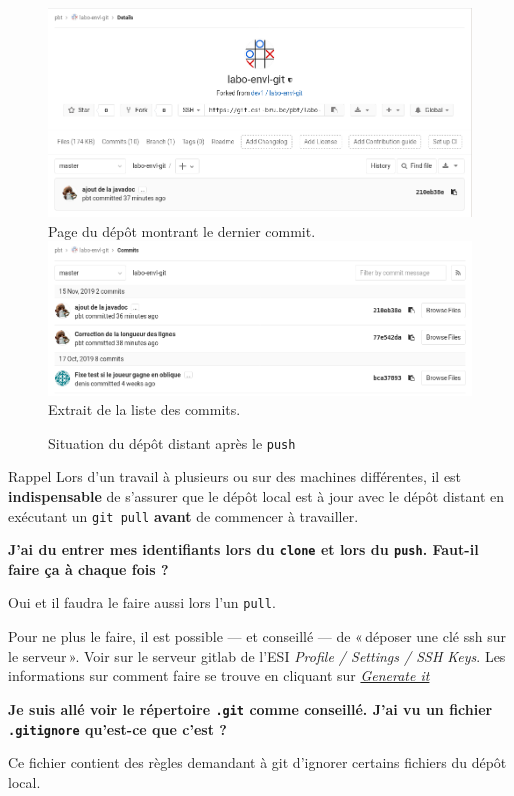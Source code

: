 \documentclass[a4paper,11pt]{style-esi/td}
\begin{document}
\begin{figure}[h]
	\centering
	\includegraphics[width=\linewidth]{img/depot-distant-apres-1.png}
	Page du dépôt montrant le dernier commit.
	\includegraphics[width=\linewidth]{img/depot-distant-apres-2.png}
	Extrait de la liste des commits.
	\caption{Situation du dépôt distant après le \texttt{push}}
	\label{fig:git-push}
\end{figure}

\begin{alertit}{Rappel}
Lors d'un travail à plusieurs ou sur des machines différentes, il est
\textbf{indispensable} de s'assurer que le dépôt local est à jour avec le dépôt
distant en exécutant un \texttt{git pull} \textbf{avant} de commencer à travailler. 
\end{alertit}


\begin{faq}

	\textbf{J'ai du entrer mes identifiants lors du \texttt{clone} et lors du
	\texttt{push}. Faut-il faire ça à chaque fois ? }
	\medskip

	Oui et il faudra le faire aussi lors l'un \texttt{pull}. 

	Pour ne plus le faire, il est possible — et conseillé — de « déposer une
	clé ssh sur le serveur ». Voir sur le serveur gitlab de l'ESI
	\textit{Profile / Settings / SSH Keys}. Les informations sur comment faire se
	trouve en cliquant sur \href{https://git.esi-bru.be/help/ssh/README}
	{\textit{Generate it}}

	\bigskip
	\textbf{Je suis allé voir le répertoire \texttt{.git} comme conseillé. J'ai 
	vu un fichier \texttt{.gitignore} qu'est-ce que c'est ?}
	\medskip

	Ce fichier contient des règles demandant à git d'ignorer certains fichiers du
	dépôt local. 


\end{faq}
\end{document}

